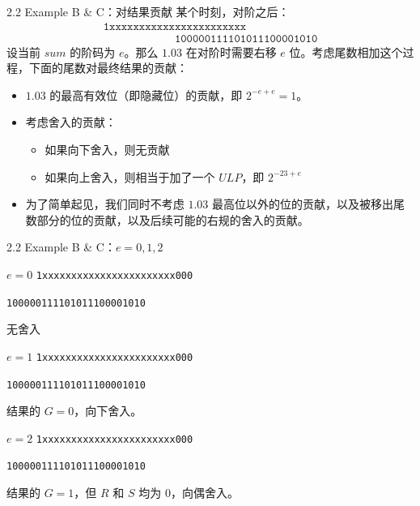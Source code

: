 \documentclass{beamer}
\begin{document}
\begin{frame}{2.2 Example B \& C：对结果贡献}
某个时刻，对阶之后：
\[
\begin{gathered}
\texttt{1xxxxxxxxxxxxxxxxxxxxxxx}\\[-0.55em]
\phantom{\texttt{1xxxxxxxxxxx}}\texttt{100000111101011100001010}
\end{gathered}
\]
\pause
设当前 $sum$ 的阶码为 $e$。那么 $1.03$ 在对阶时需要右移 $e$ 位。考虑尾数相加这个过程，下面的尾数对最终结果的贡献：
\pause
\begin{itemize}
  \item $1.03$ 的最高有效位（即隐藏位）的贡献，即 $2^{-e+e}=1$。
  \pause
  \item 考虑舍入的贡献：
  \pause
  \begin{itemize}
    \item 如果向下舍入，则无贡献
    \pause
    \item 如果向上舍入，则相当于加了一个 $ULP$，即 $2^{-23+e}$
  \end{itemize}
  \pause
  \item 为了简单起见，我们同时不考虑 $1.03$ 最高位以外的位的贡献，以及被移出尾数部分的位的贡献，以及后续可能的右规的舍入的贡献。
\end{itemize}
\end{frame}

\begin{frame}{2.2 Example B \& C：$e=0,1,2$}
\begin{block}{$e=0$}
\texttt{1xxxxxxxxxxxxxxxxxxxxxxx000}

\texttt{100000111101011100001010}

无舍入
\end{block}
\pause
\begin{block}{$e=1$}
\texttt{1xxxxxxxxxxxxxxxxxxxxxxx000}

\texttt{\hspace*{0.6em}100000111101011100001010}

结果的 $G=0$，向下舍入。
\end{block}
\pause
\begin{block}{$e=2$}
\texttt{1xxxxxxxxxxxxxxxxxxxxxxx000}

\texttt{\hspace*{1.2em}100000111101011100001010}

结果的 $G=1$，但 $R$ 和 $S$ 均为 $0$，向偶舍入。
\end{block}
\end{frame}
\end{document}

